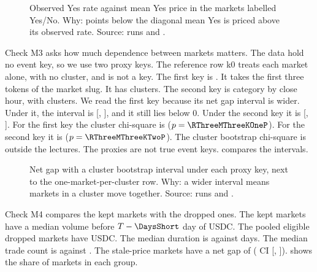 \begin{figure}[H]
\centering
{}
\caption{Observed Yes rate against mean Yes price in the markets labelled Yes/No. Why: points below the diagonal mean Yes is priced above its observed rate. Source: runs \RThreeRun{} and \RThreeFigRun.}
\label{fig:r3-m2}
\end{figure}

Check M3 asks how much dependence between markets matters.
The data hold no event key, so we use two proxy keys.
The reference row k0 treats each market alone, with no cluster, and is not a key.
The first key is \texttt{\RThreeMThreeReadProxy}.
It takes the first three tokens of the market slug.
It has \RThreeMThreeKOneNClusters{} clusters.
The second key is category by close hour, with \RThreeMThreeKTwoNClusters{} clusters.
We read the first key because its net gap interval is wider.
Under it, the \CiLevel{} interval is [\RThreeMThreeKOneNetGapCiLow, \RThreeMThreeKOneNetGapCiHigh], and it still lies below 0.
Under the second key it is [\RThreeMThreeKTwoNetGapCiLow, \RThreeMThreeKTwoNetGapCiHigh].
For the first key the cluster chi-square is \RThreeMThreeKOneChiSq{} ($p=\RThreeMThreeKOneP$).
For the second key it is \RThreeMThreeKTwoChiSq{} ($p=\RThreeMThreeKTwoP$).
The cluster bootstrap chi-square is outside the lectures.
The proxies are not true event keys.
 compares the intervals.

\begin{figure}[H]
\centering
{}
\caption{Net gap with a cluster bootstrap interval under each proxy key, next to the one-market-per-cluster row. Why: a wider interval means markets in a cluster move together. Source: runs \RThreeRun{} and \RThreeFigRun.}
\label{fig:r3-m3}
\end{figure}

Check M4 compares the kept markets with the dropped ones.
The kept markets have a median volume before $T-\DaysShort$ day of \RThreeMFourKeptMedianVolumeBeforeDay{} USDC.
The pooled eligible dropped markets have \RThreeMFourDroppedMedianVolumeBeforeDay{} USDC.
The median duration is \RThreeMFourKeptMedianDuration{} against \RThreeMFourDroppedMedianDuration{} days.
The median trade count is \RThreeMFourKeptMedianTrades{} against \RThreeMFourDroppedMedianTrades.
The stale-price markets have a net gap of \RThreeMFourStaleNetGap{} (\CiLevel{} CI [\RThreeMFourStaleNetGapCiLow, \RThreeMFourStaleNetGapCiHigh]).
 shows the share of markets in each group.

